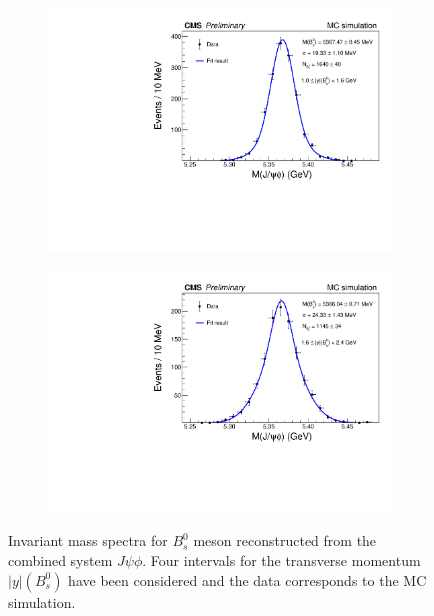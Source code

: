 \begin{figure}
\begin{subfigure}[b]{0.475\textwidth}
		\includegraphics[width=\textwidth]{MainContent/Figs/mass/mass_BsFitMC_best1_ybins_1.0_1.6.PDF}
		\caption{}
	\end{subfigure}
	\hfill
	\begin{subfigure}[b]{0.475\textwidth}
		\centering
		\includegraphics[width=\textwidth]{MainContent/Figs/mass/mass_BsFitMC_best1_ybins_1.6_2.4.PDF}
		\caption{}%
	\end{subfigure}
	\caption{Invariant mass spectra for $B^0_s$ meson reconstructed from the combined system $J\psi \phi$. Four intervals for the transverse momentum $|y|(B^0_s)$ have been considered and the data corresponds to the MC simulation.}
	\label{fig:massMC_ybins}
\end{figure}



